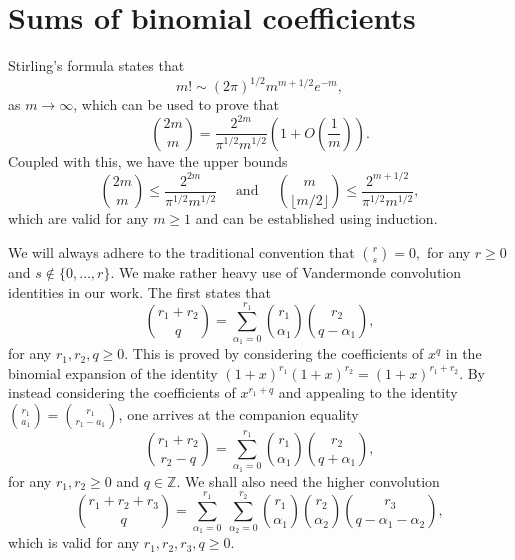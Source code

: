 \documentclass[11pt, reqno]{amsart}
\numberwithin{equation}{section}
\newcommand{\ZZ}{\mathbb{Z}}
\renewcommand{\leq}{\leqslant}
\renewcommand{\geq}{\geqslant}
\begin{document}
\section{Sums of binomial coefficients}\label{sec:binom}

Stirling's formula   states that
\begin{equation}
\label{Stirling}
m! \sim (2 \pi)^{1/2} m^{m+1/2} e^{-m},
\end{equation}
as $m\to \infty$, which can be used to prove that 
\begin{equation}
\label{Estimate Stirling binom}
\binom{2m}{m} = \frac{2^{2m}}{\pi^{1/2} m^{1/2}} \left(1 + O \left( \frac1{m} \right) \right).
\end{equation}
Coupled with this, we have the upper bounds
\begin{equation}
\label{Upper bound Stirling binom}
\binom{2m}{m} \leq \frac{2^{2m}}{\pi^{1/2} m^{1/2}} \quad \text{ and } \quad 
\binom{m}{\lfloor m/2 \rfloor} \leq \frac{2^{m+1/2}}{\pi^{1/2} m^{1/2}},
\end{equation}
which are valid for any  $m \geq 1$ and can be established using induction. 

We will always adhere  to the traditional convention that 
$
\binom{r}{s} = 0,
$
for any $r \geq 0$ and $s \notin \{0, \dots, r\}$.  We  make rather heavy use of  Vandermonde convolution identities in our work. 
The first states that 
\begin{equation}
\label{Identity VDM}
\binom{r_1+r_2}{q} = \sum_{\alpha_1=0}^{r_1} \binom{r_1}{\alpha_1} \binom{r_2}{q-\alpha_1},
\end{equation}
for any $r_1, r_2, q \geq 0$. This is proved by considering the coefficients of $x^q$ in the binomial expansion of the identity $(1+x)^{r_1}(1+x)^{r_2}=(1+x)^{r_1+r_2}$. By instead considering  the coefficients of $x^{r_1+q}$ and appealing to the identity
$\binom{r_1}{a_1}=\binom{r_1}{r_1-a_1}$, one  arrives at the companion equality
\begin{equation}
\label{Identity VDM'}
\binom{r_1+r_2}{r_2-q} = \sum_{\alpha_1=0}^{r_1} \binom{r_1}{\alpha_1} \binom{r_2}{q+\alpha_1},
\end{equation}
for any $r_1,r_2\geq 0$ and $q\in \ZZ$.
We shall also need the higher convolution
\begin{equation}
\label{Identity VDM2}
\binom{r_1+r_2+r_3}{q} = \sum_{\alpha_1=0}^{r_1} \ \sum_{\alpha_2=0}^{r_2} \binom{r_1}{\alpha_1} \binom{r_2}{\alpha_2} \binom{r_3}{q-\alpha_1-\alpha_2},
\end{equation}
which is valid for any $r_1,r_2,r_3,q\geq 0$.
\end{document}
